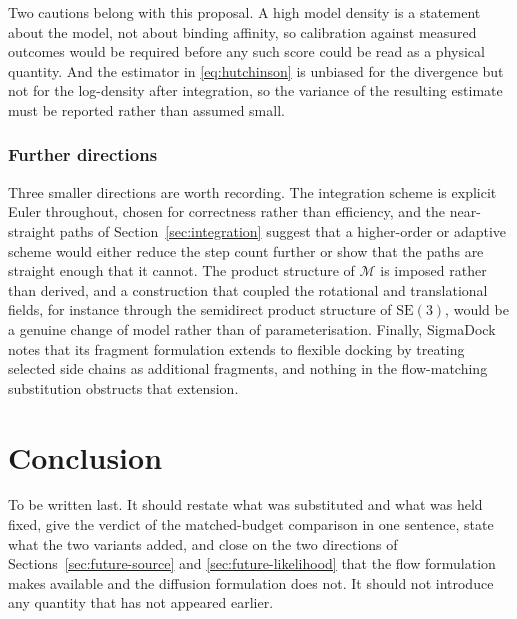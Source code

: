 \documentclass[11pt,a4paper]{report}
\theoremstyle{plain}
\theoremstyle{definition}
\theoremstyle{remark}
\newenvironment{reserved}[1]{%
    \begin{tcolorbox}[
      enhanced, breakable,
      colback=PanelGrey, colframe=DraftBlue,
      boxrule=0.5pt, left=6pt,right=6pt,top=5pt,bottom=5pt,
      fonttitle=\bfseries\small\sffamily,
      title={RESERVED \textendash\ #1}]
      \small\sffamily
  }{%
    \end{tcolorbox}
  }
\newenvironment{reserved}[1]{\setbox0=\vbox\bgroup}{\egroup}
\newcommand{\SEthree}{\mathrm{SE}(3)}
\newcommand{\Mfd}{\mathcal{M}}
\begin{document}
Two cautions belong with this proposal. A high model density is a statement
about the model, not about binding affinity, so calibration against measured
outcomes would be required before any such score could be read as a physical
quantity. And the estimator in \eqref{eq:hutchinson} is unbiased for the
divergence but not for the log-density after integration, so the variance of
the resulting estimate must be reported rather than assumed small.

\subsection{Further directions}

Three smaller directions are worth recording. The integration scheme is
explicit Euler throughout, chosen for correctness rather than efficiency, and
the near-straight paths of Section~\ref{sec:integration} suggest that a
higher-order or adaptive scheme would either reduce the step count further or
show that the paths are straight enough that it cannot. The product structure
of $\Mfd$ is imposed rather than derived, and a construction that coupled the
rotational and translational fields, for instance through the semidirect
product structure of $\SEthree$, would be a genuine change of model rather than
of parameterisation. Finally, SigmaDock notes that its fragment formulation
extends to flexible docking by treating selected side chains as additional
fragments, and nothing in the flow-matching substitution obstructs that
extension.

\chapter{Conclusion}
\label{ch:conclusion}

\begin{reserved}{Conclusion}
To be written last. It should restate what was substituted and what was held
fixed, give the verdict of the matched-budget comparison in one sentence,
state what the two variants added, and close on the two directions of
Sections~\ref{sec:future-source} and \ref{sec:future-likelihood} that the flow
formulation makes available and the diffusion formulation does not. It should
not introduce any quantity that has not appeared earlier.
\end{reserved}



\end{document}
